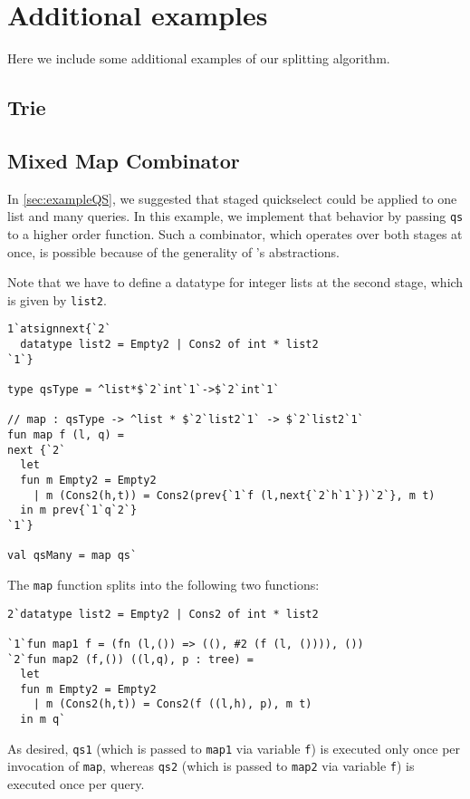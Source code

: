 \section{Additional examples}

Here we include some additional examples of our splitting algorithm.

\subsection{Trie}


\subsection {Mixed Map Combinator}

In \ref{sec:exampleQS}, we suggested that staged quickselect could be applied to one list and many queries.
In this example, we implement that behavior by passing \texttt{qs} to a higher order function.
Such a combinator, which operates over both stages at once, is possible because of the generality of \lang's abstractions.

Note that we have to define a datatype for integer lists at the second stage, which is given by \texttt{list2}.
\begin{lstlisting} 
1`atsignnext{`2`
  datatype list2 = Empty2 | Cons2 of int * list2
`1`}

type qsType = ^list*$`2`int`1`->$`2`int`1`

// map : qsType -> ^list * $`2`list2`1` -> $`2`list2`1`
fun map f (l, q) = 
next {`2`
  let 
  fun m Empty2 = Empty2
    | m (Cons2(h,t)) = Cons2(prev{`1`f (l,next{`2`h`1`})`2`}, m t)
  in m prev{`1`q`2`}
`1`}

val qsMany = map qs`
\end{lstlisting}
The \texttt{map} function splits into the following two functions:
\begin{lstlisting} 
2`datatype list2 = Empty2 | Cons2 of int * list2

`1`fun map1 f = (fn (l,()) => ((), #2 (f (l, ()))), ())
`2`fun map2 (f,()) ((l,q), p : tree) =
  let 
  fun m Empty2 = Empty2
    | m (Cons2(h,t)) = Cons2(f ((l,h), p), m t) 
  in m q`
\end{lstlisting}

As desired, \texttt{qs1} (which is passed to \texttt{map1} via variable \texttt{f}) is executed only once per invocation of \texttt{map},
whereas \texttt{qs2} (which is passed to \texttt{map2} via variable \texttt{f}) is executed once per query.

